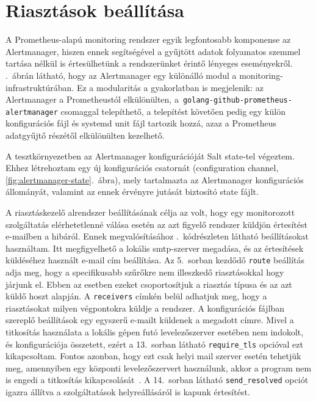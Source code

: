 \section{Riasztások beállítása}
A Prometheus-alapú monitoring rendszer egyik legfontosabb komponense az Alertmanager, hiszen ennek segítségével a gyűjtött adatok folyamatos szemmel tartása nélkül is értesülhetünk a rendszerünket érintő lényeges eseményekről.
.~ábrán látható, hogy az Alertmanager egy különálló modul a monitoring-infrastruktúrában. Ez a modularitás a gyakorlatban is megjelenik: az Alertmanager a Prometheustól elkülönülten, a~\texttt{golang-github-prometheus-alertmanager} csomaggal telepíthető, a telepítést követően pedig egy külön konfigurációs fájl és systemd unit fájl tartozik hozzá, azaz a Prometheus adatgyűjtő részétől elkülönülten kezelhető.

A tesztkörnyezetben az Alertmanager konfigurációját Salt state-tel végeztem. Ehhez létrehoztam egy új konfigurációs csatornát (configuration channel, \ref{fig:alertmanager-state}.~ábra), mely tartalmazta az Alertmanager konfigurációs állományát, valamint az ennek érvényre jutását biztosító state fájlt.

A riasztáskezelő alrendszer beállításának célja az volt, hogy egy monitorozott szolgáltatás elérhetetlenné válása esetén az azt figyelő rendszer küldjön értesítést e-mailben a hibáról. Ennek megvalósításához .~kódrészleten látható beállításokat használtam. Itt megfigyelhető a lokális \acrshort{smtp}-szerver megadása, és az értesítések küldéséhez használt e-mail cím beállítása.
Az 5.~sorban kezdődő \texttt{route} beállítás adja meg, hogy a specifikusabb szűrőkre nem illeszkedő riasztásokkal hogy járjunk el. Ebben az esetben ezeket csoportosítjuk a riasztás típusa és az azt küldő hoszt alapján. A \texttt{receivers} címkén belül adhatjuk meg, hogy a riasztásokat milyen végpontokra küldje a rendszer. A konfigurációs fájlban szereplő beállítások egy egyszerű e-mailt küldenek a megadott címre. Mivel a titkosítás használata a lokális gépen futó levelezőszerver esetében nem indokolt, és konfigurációja összetett, ezért a 13.~sorban látható \texttt{require\_tls} opcióval ezt kikapcsoltam. Fontos azonban, hogy ezt csak helyi mail szerver esetén tehetjük meg, amennyiben egy központi levelezőszervert használunk, akkor a program nem is engedi a titkosítás kikapcsolását~\cite{PrometheusAlertmanagerConfig}.
A 14.~sorban látható \texttt{send\_resolved} opciót igazra állítva a szolgáltatások helyreállásáról is kapunk értesítést. %

